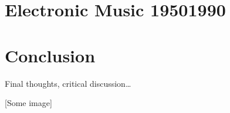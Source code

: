 \documentclass[letterpaper,10pt,english]{sphinxmanual}
\begin{document}
\chapter{Electronic Music 1950\sphinxhyphen{}1990}
\label{\detokenize{electronic:electronic-music-1950-1990}}\label{\detokenize{electronic::doc}}

\chapter{Conclusion}
\label{\detokenize{conclusion:conclusion}}\label{\detokenize{conclusion::doc}}
Final thoughts, critical discussion…

{[}Some image{]}



\renewcommand{\indexname}{Index}
\printindex
\end{document}
